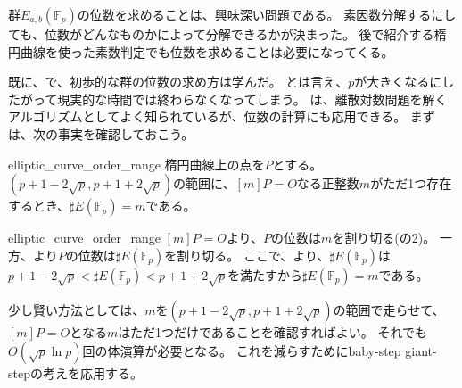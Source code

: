 群$E_{a,b}(\mathbb{F}_p)$の位数を求めることは、興味深い問題である。
素因数分解するにしても、位数がどんなものかによって分解できるかが決まった。
後で紹介する楕円曲線を使った素数判定でも位数を求めることは必要になってくる。

既に、で、初歩的な群の位数の求め方は学んだ。
とは言え、$p$が大きくなるにしたがって現実的な時間では終わらなくなってしまう。
は、離散対数問題を解くアルゴリズムとしてよく知られているが、位数の計算にも応用できる。
まずは、次の事実を確認しておこう。

\begin{Prop}{}{elliptic_curve_order_range}
楕円曲線上の点を$P$とする。
$(p+1-2\sqrt{p}, p+1+2\sqrt{p})$の範囲に、$[m]P=O$なる正整数$m$がただ1つ存在するとき、$\sharp E(\mathbb{F}_{p})=m$である。
\end{Prop}

\begin{prProof}{elliptic_curve_order_range}
$[m]P=O$より、$P$の位数は$m$を割り切る(の2)。
一方、より$P$の位数は$\sharp E(\mathbb{F}_{p})$を割り切る。
ここで、より、$\sharp E(\mathbb{F}_{p})$は$p+1-2\sqrt{p}<\sharp E(\mathbb{F}_{p})<p+1+2\sqrt{p}$を満たすから$\sharp E(\mathbb{F}_{p})=m$である。
\end{prProof}

少し賢い方法としては、$m$を$(p+1-2\sqrt{p}, p+1+2\sqrt{p})$の範囲で走らせて、$[m]P=O$となる$m$はただ1つだけであることを確認すればよい。
それでも$O(\sqrt{p}\ln{p})$回の体演算が必要となる。
これを減らすためにbaby-step giant-stepの考えを応用する。


